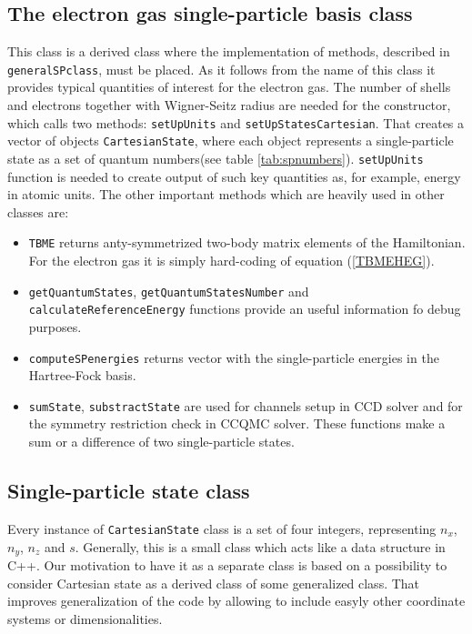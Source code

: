 \documentclass[twoside,english]{uiofysmaster}
\newcommand{\classname}[1]{\texttt{#1}}
\begin{document}
\subsection{The electron gas single-particle basis class}
This class is a derived class where the implementation of methods, described in \classname{generalSPclass},
must be placed. As it follows from the name of this class it provides typical quantities of interest for the electron gas. The number of shells and electrons together with Wigner-Seitz radius are needed for the constructor, which calls two methods: \classname{setUpUnits} and \classname{setUpStatesCartesian}. That creates a vector of objects \classname{CartesianState}, where each object represents a single-particle state as a set of quantum numbers(see table \ref{tab:spnumbers}).
\classname{setUpUnits} function is needed to create output of such key quantities as, for example, energy in atomic units. The other important methods which are heavily used in other classes are:
\begin{itemize}
	\item \classname{TBME} returns anty-symmetrized two-body matrix elements of the Hamiltonian. For the electron gas it is simply hard-coding of equation (\ref{TBMEHEG}).
	\item \classname{getQuantumStates}, \classname{getQuantumStatesNumber} and \\ \classname{calculateReferenceEnergy} functions provide an useful information fo debug purposes.
	\item \classname{computeSPenergies} returns vector with the single-particle energies in the Hartree-Fock basis.
	\item \classname{sumState}, \classname{substractState} are used for channels setup in CCD solver and for the symmetry restriction check in CCQMC solver. These functions make a sum or a difference of two single-particle states. 
\end{itemize}


\subsection{Single-particle state class}
Every instance of \classname{CartesianState} class is a set of four integers, representing $n_x$, $n_y$, $n_z$ and $s$. Generally, this is a small class which acts like a data structure in C++. Our motivation to have it as a separate class is based on a possibility to consider Cartesian state as a derived class of some generalized class. That improves generalization of the code by allowing to include easyly other coordinate systems or dimensionalities.
\end{document}
